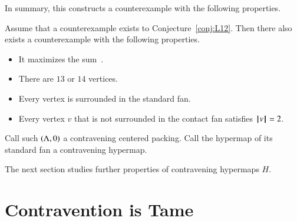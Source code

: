 In summary, this constructs a counterexample with the following properties.

\begin{lemma}\label{lemma:CE} 
Assume that a counterexample exists to Conjecture~\ref{conj:L12}.  Then there also exists a counterexample with the following properties.
\begin{itemize}
\item It maximizes the sum~.
\item There are $13$ or $14$ vertices.
\item Every vertex is surrounded in the standard fan.
\item Every vertex $v$ that is not surrounded in the contact
fan satisfies ${{\hskip0.1em|\hskip-0.15em|\hskip0.1em}v{\hskip0.1em|\hskip-0.15em|\hskip0.1em}}=2$.
\end{itemize}
\end{lemma}





\begin{definition}
Call such $(\Lambda,0)$ a contravening centered packing. 
Call the hypermap of its standard fan a contravening hypermap.
\end{definition}


The next section studies further properties of contravening hypermaps $H$.



\section{Contravention is Tame}
    \label{sec:contraproof}

